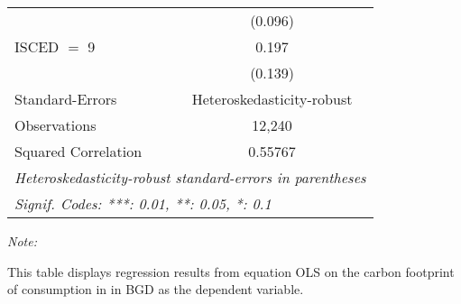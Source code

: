 \begin{table}[htbp!]
\begin{adjustbox}{width = 1\textwidth, max height = 0.95\textheight, center}
\begin{threeparttable}[b]
\begin{tabular}{lc}
                                & (0.096)\\   
            ISCED $=$ 9         & 0.197\\   
                                & (0.139)\\   
            \midrule 
            Standard-Errors     & Heteroskedasticity-robust \\   
            Observations        & 12,240\\  
            Squared Correlation & 0.55767\\  
            \midrule \midrule
            \multicolumn{2}{l}{\emph{Heteroskedasticity-robust standard-errors in parentheses}}\\
            \multicolumn{2}{l}{\emph{Signif. Codes: ***: 0.01, **: 0.05, *: 0.1}}\\
         \end{tabular}
         
         \begin{tablenotes}\item \medskip \textit{Note:}
            \item This table displays regression results from equation OLS on the carbon footprint of consumption in  in BGD as the dependent variable.  
         \end{tablenotes}
      \end{threeparttable}
   \end{adjustbox}
\end{table}


